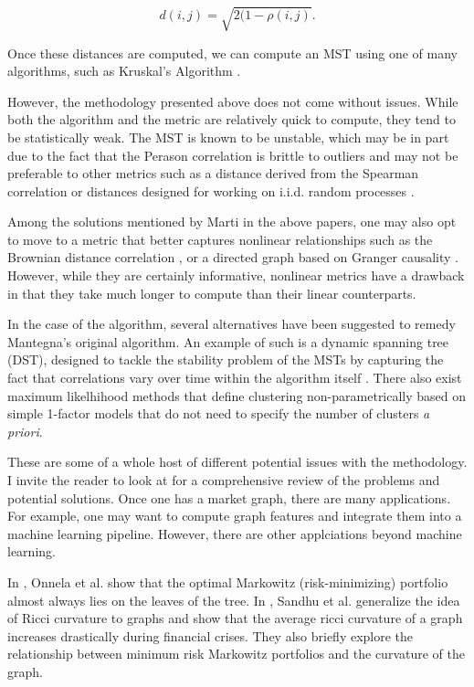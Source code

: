 \documentclass{article}
\theoremstyle{definition}
\begin{document}
\[
d(i,j) = \sqrt{2(1 - \rho(i,j)}.
\]

Once these distances are computed, we can compute an MST using one of many algorithms, such as Kruskal's Algorithm \cite{kruskalsAlgorithm}\cite{networkSurveyFinance}.

However, the methodology presented above does not come without issues. While both the algorithm and the metric are relatively quick to compute, they tend to be statistically weak. The MST is known to be unstable, which may be in part due to the fact that the Perason correlation is brittle to outliers and may not be preferable to other metrics such as a distance derived from the Spearman correlation or distances designed for working on i.i.d. random processes \cite{marti2015proposal}\cite{marti2015generic}.

Among the solutions mentioned by Marti in the above papers, one may also opt to move to a metric that better captures nonlinear relationships such as the Brownian distance correlation \cite{distanceCorrelation}, or a directed graph based on Granger causality \cite{grangerCausalityNetworks}. However, while they are certainly informative, nonlinear metrics have a drawback in that they take much longer to compute than their linear counterparts.

In the case of the algorithm, several alternatives have been suggested to remedy Mantegna's original algorithm. An example of such is a dynamic spanning tree (DST), designed to tackle the stability problem of the MSTs by capturing the fact that correlations vary over time within the algorithm itself \cite{dynamicSpanningTrees}. There also exist maximum likelhihood methods \cite{mleClustering} that define clustering non-parametrically based on simple 1-factor models that do not need to specify the number of clusters \textit{a priori}.

These are some of a whole host of different potential issues with the methodology. I invite the reader to look at \cite{networkSurveyFinance} for a comprehensive review of the problems and potential solutions. Once one has a market graph, there are many applications. For example, one may want to compute graph features and integrate them into a machine learning pipeline. However, there are other applciations beyond machine learning.

In \cite{dynamicsMarketCorrelations}, Onnela et al. show that the optimal Markowitz (risk-minimizing) portfolio almost always lies on the leaves of the tree. In \cite{sandhu2015market}, Sandhu et al. generalize the idea of Ricci curvature to graphs and show that the average ricci curvature of a graph increases drastically during financial crises. They also briefly explore the relationship between minimum risk Markowitz portfolios and the curvature of the graph.
\end{document}
